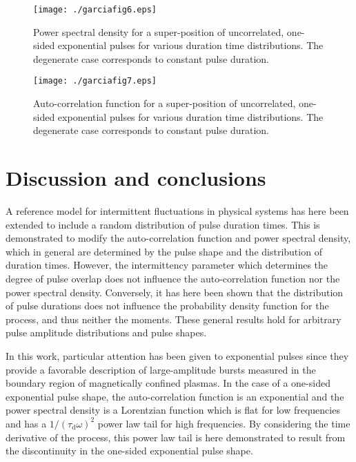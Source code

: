 \documentclass[aps,prb,12pt,a4paper,preprint,amsmath,amssymb,groupedaddress]{revtex4-1}
\newcommand{\taud}{\ensuremath{\tau_\text{d}}}
\begin{document}
\begin{figure}
\texttt{[image: ./garciafig6.eps]}
\caption{Power spectral density for a super-position of uncorrelated, one-sided exponential pulses for various duration time distributions. The degenerate case corresponds to constant pulse duration.}
\label{fig:psd-compare}
\end{figure}


\begin{figure}
\texttt{[image: ./garciafig7.eps]}
\caption{Auto-correlation function for a super-position of uncorrelated, one-sided exponential pulses for various duration time distributions. The degenerate case corresponds to constant pulse duration.}
\label{fig:acf-compare}
\end{figure}



\section{Discussion and conclusions}\label{sec:disc}



A reference model for intermittent fluctuations in physical systems has here been extended to include a random distribution of pulse duration times. This is demonstrated to modify the auto-correlation function and power spectral density, which in general are determined by the pulse shape and the distribution of duration times. However, the intermittency parameter which determines the degree of pulse overlap does not influence the auto-correlation function nor the power spectral density. Conversely, it has here been shown that the distribution of pulse durations does not influence the probability density function for the process, and thus neither the moments. These general results hold for arbitrary pulse amplitude distributions and pulse shapes.


In this work, particular attention has been given to exponential pulses since they provide a favorable description of large-amplitude bursts measured in the boundary region of magnetically confined plasmas. In the case of a one-sided exponential pulse shape, the auto-correlation function is an exponential and the power spectral density is a Lorentzian function which is flat for low frequencies and has a $1/(\taud\omega)^2$ power law tail for high frequencies. By considering the time derivative of the process, this power law tail is here demonstrated to result from the discontinuity in the one-sided exponential pulse shape.
\end{document}
